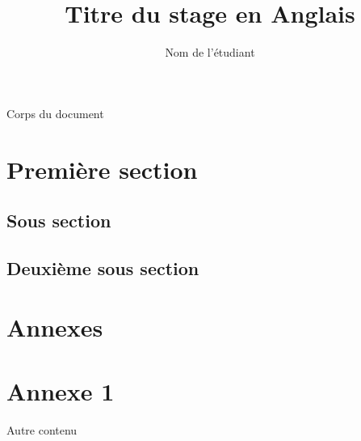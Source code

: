 \documentclass{rapportcpe}
\title{Titre du stage en Anglais}
\author{Nom de l'étudiant}
\begin{document}
	\tableofcontents %
	Corps du document
	\section{Première section}
	\subsection{Sous section}

\pagebreak
	\subsection{Deuxième sous section}

\section{Annexes}
\appendix %

\section{Annexe 1}
Autre contenu
\end{document}
